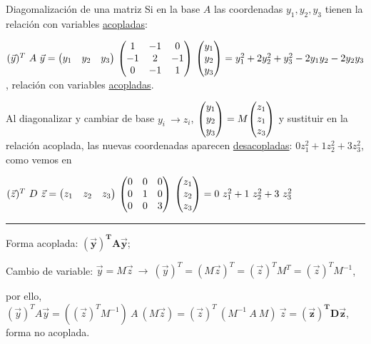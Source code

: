\begin{myexampleblock}{Diagomalización de una matriz}
\vspace{4mm}Si en la base $A$ las coordenadas $y_1,y_2,y_3$ tienen la relación con variables \underline{acopladas}:

\vspace{2mm}$(\vec y)^T \ A \ \vec y = \mqty(y_1&y_2&y_3)\ \mqty(1&-1&0\\-1&2&-1\\0&-1&1) \ \mqty(y_1\\y_2\\y_3)=y_1^2+2y_2^2+y_3^2-2y_1y_2-2y_2y_3$, relación con variables \underline{acopladas}.

\vspace{2mm}Al diagonalizar y cambiar de base $y_i \ \to z_i$, $\mqty(y_1\\y_2\\y_3)=M \mqty(z_1\\z_1\\z_3)$ y sustituir en la relación acoplada, las nuevas coordenadas aparecen \underline{desacopladas}: $0z_1^2+1z_2^2+3z_3^2$, como vemos en

\vspace{2mm} $(\vec z)^T \ D \ \vec z= 
 \mqty(z_1&z_2&z_3)\ \mqty(0&0&0\\0&1&0\\0&0&3) \ \mqty(z_1\\z_2\\z_3)=0\ z_1^2 + 1\ z_2^2 + 3\ z_3^2$
 
\vspace{2mm} \begin{center} \rule{200pt}{0.1pt} \end{center}

Forma acoplada: $\boldsymbol{(\vec y)^T A \vec y}$; 

Cambio de variable: $\vec y=M \vec z  \ \to \ (\vec y)^T=(M \vec z)^T=(\vec z)^T M^T=(\vec z)^T M^{-1}$, 

por ello,  $(\vec y)^T A \vec y = ((\vec z)^T  M^{-1} ) \ A  \ (M  \vec z ) = (\vec z)^T \ (M^{-1} \ A \ M ) \ \vec z= \boldsymbol{(\vec z)^T D \vec z}$, forma no acoplada.

$\,$

\end{myexampleblock}

\vspace{10mm}

